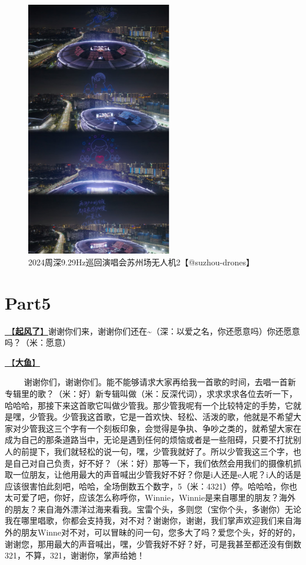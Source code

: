 \documentclass[]{ctexbook}
\begin{document}
\begin{figure}

{\centering \includegraphics[width=180pt]{img/suzhou20241109/002} 

}

\caption{2024周深9.29Hz巡回演唱会苏州场无人机2【@suzhou-drones】}\label{fig:unnamed-chunk-117}
\end{figure}

\section{Part5}\label{suzhou-20241109-part5}

\hyperref[the-wind-rises]{🎵【\textbf{起风了}】}谢谢你们来，谢谢你们还在\textasciitilde（深：以爱之名，你还愿意吗）你还愿意吗？（米：愿意）

\hyperref[big-fish]{🎵【\textbf{大鱼}】}

   谢谢你们，谢谢你们。能不能够请求大家再给我一首歌的时间，去唱一首新专辑里的歌？（米：好）新专辑叫做（米：反深代词），求求求求各位去听一下，哈哈哈，那接下来这首歌它叫做少管我。那少管我呢有一个比较特定的手势，它就是嘿，少管我。少管我这首歌，它是一首欢快、轻松、活泼的歌，他就是不希望大家对少管我这三个字有一个刻板印象，会觉得是争执、争吵之类的，就希望大家在成为自己的那条道路当中，无论是遇到任何的烦恼或者是一些阻碍，只要不打扰别人的前提下，我们就轻松的说一句，嘿，少管我就好了。所以少管我这三个字，也是自己对自己负责，好不好？（米：好）那等一下，我们依然会用我们的摄像机抓取一位朋友，让他用最大的声音喊出少管我好不好？你是i人还是e人呢？i人的话是应该很害怕此刻吧，哈哈，全场倒数五个数字，5（米：4321）停。哈哈哈，你也太可爱了吧，你好，应该怎么称呼你，Winnie，Winnie是来自哪里的朋友？海外的朋友？来自海外漂洋过海来看我。宝雷个头，多则您（宝你个头，多谢你）无论我在哪里唱歌，你都会支持我，对不对？谢谢你，谢谢，我们掌声欢迎我们来自海外的朋友Winne对不对，可以冒昧的问一句，您多大了吗？爱您个头，好的好的，谢谢您，那用最大的声音喊出，嘿，少管我好不好？好，可是我甚至都还没有倒数321，不算，321，谢谢你，掌声给她！
\end{document}
